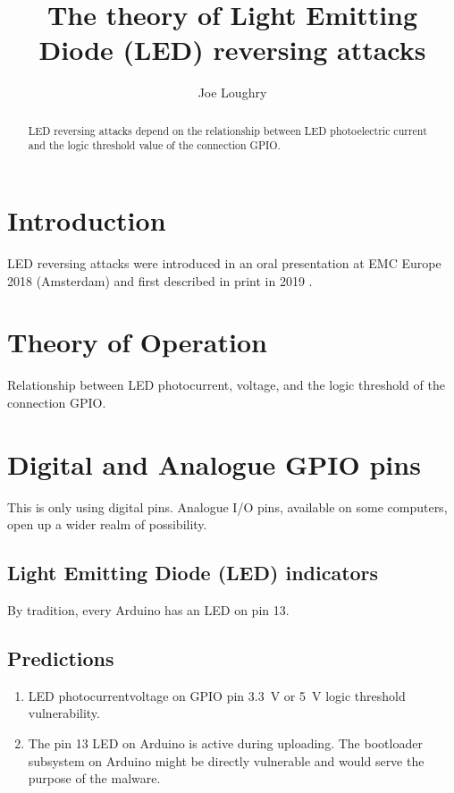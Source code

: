 \documentclass[a4paper,notitlepage]{article}
\begin{document}
\title{The theory of Light Emitting Diode (LED) reversing attacks}
\author{Joe Loughry}
\maketitle
\begin{abstract}
  LED reversing attacks depend on the relationship between LED photoelectric
  current and the logic threshold value of the connection GPIO.
\end{abstract}
\maketitle
\section{Introduction}
LED reversing attacks were introduced in an oral presentation at EMC Europe
2018 (Amsterdam) and first described in print in 2019 \cite{Loughry2019}.
\section{Theory of Operation}
Relationship between LED photocurrent, voltage, and the logic threshold of the
connection GPIO.
\section{Digital and Analogue GPIO pins}
This is only using digital pins. Analogue I/O pins, available on some
computers, open up a wider realm of possibility.
\subsection{Light Emitting Diode (LED) indicators}
By tradition, every Arduino has an LED on pin 13.
\subsection{Predictions}
\begin{enumerate}
  \item LED photocurrent\textrightarrow voltage on GPIO pin\textrightarrow
    \SI{3.3}{\volt} or \SI{5}{\volt} logic threshold\textrightarrow
    vulnerability.
  \item The pin 13 LED on Arduino is active during uploading. The bootloader
    subsystem on Arduino might be directly vulnerable and would serve the
    purpose of the malware.
\end{enumerate}
\end{document}
